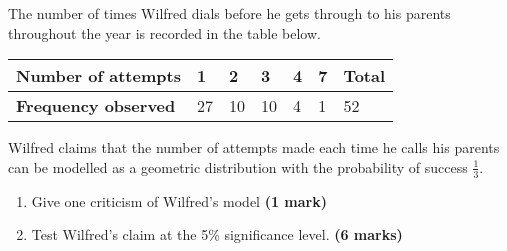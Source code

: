\documentclass[fleqn]{article}
\begin{document}
\begin{enumerate}
        The number of times Wilfred dials before he gets through to his parents throughout the year is recorded in the table below.\vspace{-1mm}
        \begin{center}
            \begin{tabularx}{0.75\textwidth}{|X|*6{P{12mm}|}}
                \hline
                \textbf{Number of attempts} & 1  & 2  & 3  & 4 & 7 & \textbf{Total}  \\\hline
                \textbf{Frequency observed} & 27 & 10 & 10 & 4 & 1 & 52              \\\hline
            \end{tabularx}
        \end{center}\vspace{3mm}
        Wilfred claims that the number of attempts made each time he calls his parents can be modelled as a geometric distribution with the probability of success $\frac{1}{3}$.
        \begin{enumerate}[label=\bfseries \alph*\space ]
            \item Give one criticism of Wilfred's model \hfill\textbf{(1 mark)}
            \item Test Wilfred's claim at the 5\% significance level. \hfill\textbf{(6 marks)}
        \end{enumerate}
\end{enumerate}
\end{document}
